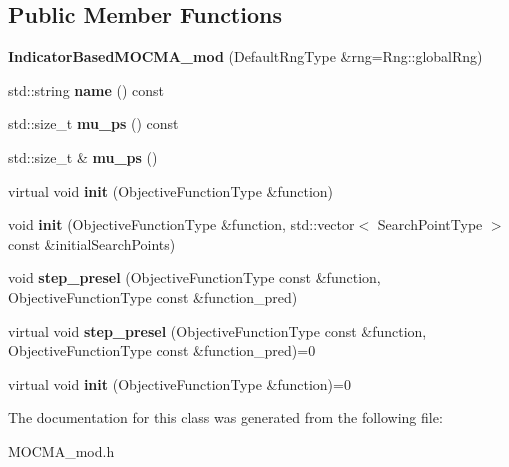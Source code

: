 \subsection*{Public Member Functions}
\begin{DoxyCompactItemize}
\item 
{\bfseries Indicator\+Based\+M\+O\+C\+M\+A\+\_\+mod} (Default\+Rng\+Type \&rng=Rng\+::global\+Rng)\hypertarget{classIndicatorBasedMOCMA__mod_a913c0d1a35754d7b2cb36dbeb24196b0}{}\label{classIndicatorBasedMOCMA__mod_a913c0d1a35754d7b2cb36dbeb24196b0}

\item 
std\+::string {\bfseries name} () const \hypertarget{classIndicatorBasedMOCMA__mod_a63553133a29a03a42652f5f96518155b}{}\label{classIndicatorBasedMOCMA__mod_a63553133a29a03a42652f5f96518155b}

\item 
std\+::size\+\_\+t {\bfseries mu\+\_\+ps} () const \hypertarget{classIndicatorBasedMOCMA__mod_ab1ce8157eaa462b10bad60937ac5d5fd}{}\label{classIndicatorBasedMOCMA__mod_ab1ce8157eaa462b10bad60937ac5d5fd}

\item 
std\+::size\+\_\+t \& {\bfseries mu\+\_\+ps} ()\hypertarget{classIndicatorBasedMOCMA__mod_a692a7d4406ec8863b4c91b013d244c04}{}\label{classIndicatorBasedMOCMA__mod_a692a7d4406ec8863b4c91b013d244c04}

\item 
virtual void {\bfseries init} (Objective\+Function\+Type \&function)\hypertarget{classIndicatorBasedMOCMA__mod_a70675a66ba764b5eb7b1f8a1255759a8}{}\label{classIndicatorBasedMOCMA__mod_a70675a66ba764b5eb7b1f8a1255759a8}

\item 
void {\bfseries init} (Objective\+Function\+Type \&function, std\+::vector$<$ Search\+Point\+Type $>$ const \&initial\+Search\+Points)\hypertarget{classIndicatorBasedMOCMA__mod_a3441aaaa8762dfbf9de5cfeea0a305f6}{}\label{classIndicatorBasedMOCMA__mod_a3441aaaa8762dfbf9de5cfeea0a305f6}

\item 
void {\bfseries step\+\_\+presel} (Objective\+Function\+Type const \&function, Objective\+Function\+Type const \&function\+\_\+pred)\hypertarget{classIndicatorBasedMOCMA__mod_a7907b1eeb7920b1021ee5328d489e761}{}\label{classIndicatorBasedMOCMA__mod_a7907b1eeb7920b1021ee5328d489e761}

\item 
virtual void {\bfseries step\+\_\+presel} (Objective\+Function\+Type const \&function, Objective\+Function\+Type const \&function\+\_\+pred)=0\hypertarget{classAbstractPreselecter_ac7bd0dac8d7eaf85319524ee6d80f52d}{}\label{classAbstractPreselecter_ac7bd0dac8d7eaf85319524ee6d80f52d}

\item 
virtual void {\bfseries init} (Objective\+Function\+Type \&function)=0\hypertarget{classAbstractPreselecter_ac9283e597dc5d633b1f7ce959881dbb8}{}\label{classAbstractPreselecter_ac9283e597dc5d633b1f7ce959881dbb8}

\end{DoxyCompactItemize}


The documentation for this class was generated from the following file\+:\begin{DoxyCompactItemize}
\item 
M\+O\+C\+M\+A\+\_\+mod.\+h\end{DoxyCompactItemize}
